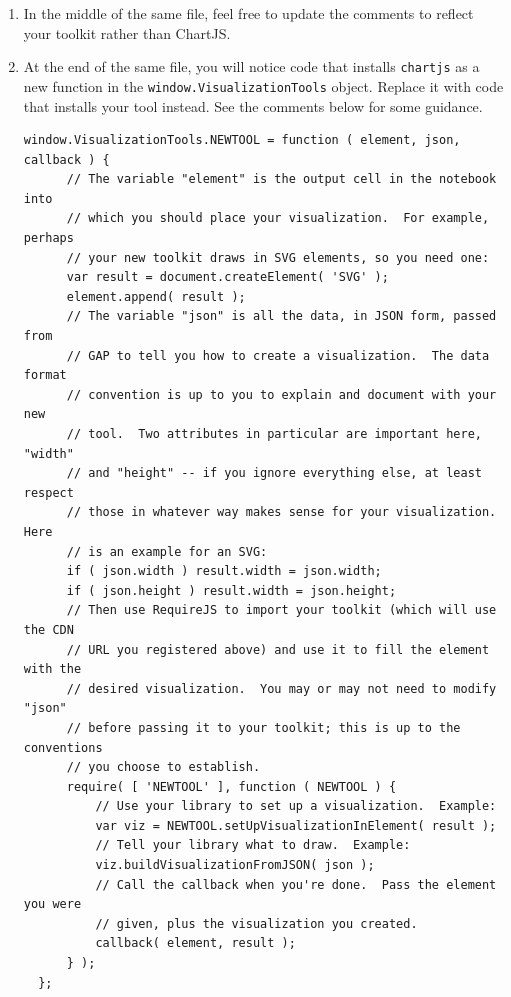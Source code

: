 \documentclass[a4paper,11pt]{report}
\begin{document}
{{\begin{enumerate}
\item In the middle of the same file, feel free to update the comments to reflect
your toolkit rather than ChartJS.
\item At the end of the same file, you will notice code that installs \texttt{chartjs} as a new function in the \texttt{window.VisualizationTools} object. Replace it with code that installs your tool instead. See the comments
below for some guidance. 
\begin{Verbatim}[commandchars=!@|,fontsize=\small,frame=single,label=Example]
  window.VisualizationTools.NEWTOOL = function ( element, json, callback ) {
      // The variable "element" is the output cell in the notebook into
      // which you should place your visualization.  For example, perhaps
      // your new toolkit draws in SVG elements, so you need one:
      var result = document.createElement( 'SVG' );
      element.append( result );
      // The variable "json" is all the data, in JSON form, passed from
      // GAP to tell you how to create a visualization.  The data format
      // convention is up to you to explain and document with your new
      // tool.  Two attributes in particular are important here, "width"
      // and "height" -- if you ignore everything else, at least respect
      // those in whatever way makes sense for your visualization.  Here
      // is an example for an SVG:
      if ( json.width ) result.width = json.width;
      if ( json.height ) result.width = json.height;
      // Then use RequireJS to import your toolkit (which will use the CDN
      // URL you registered above) and use it to fill the element with the
      // desired visualization.  You may or may not need to modify "json"
      // before passing it to your toolkit; this is up to the conventions
      // you choose to establish.
      require( [ 'NEWTOOL' ], function ( NEWTOOL ) {
          // Use your library to set up a visualization.  Example:
          var viz = NEWTOOL.setUpVisualizationInElement( result );
          // Tell your library what to draw.  Example:
          viz.buildVisualizationFromJSON( json );
          // Call the callback when you're done.  Pass the element you were
          // given, plus the visualization you created.
          callback( element, result );
      } );
  };
\end{Verbatim}
 

\end{enumerate}}}
\end{document}
